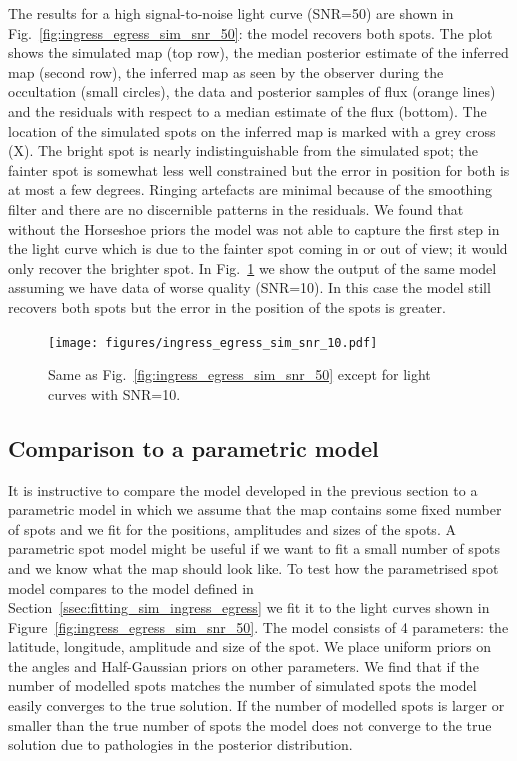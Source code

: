 \documentclass[12pt,dvipsnames]{report}
\begin{document}
The results for a high signal-to-noise light curve (SNR=50) are shown in Fig.~\ref{fig:ingress_egress_sim_snr_50}: the model recovers both spots.
The plot shows the simulated map (top row), the median posterior estimate of the inferred map (second row), the inferred map as seen by the observer during the occultation (small circles), the data and posterior samples of flux (orange lines) and the residuals with respect to a median estimate of the flux (bottom). 
The location of the simulated spots on the inferred map is marked with a grey cross (X).
The bright spot is nearly indistinguishable from the simulated spot; the fainter spot is somewhat less well constrained but the error in position for both is at most a few degrees.
Ringing artefacts are minimal because of the smoothing filter and there are no discernible patterns in the residuals.
We found that without the Horseshoe priors the model was not able to capture the first step in the light curve which is due to the fainter spot coming in or out of view; it would only recover the brighter spot.
In Fig.~\ref{fig:ingress_egress_sim_snr_10} we show the output of the same model assuming we have data of worse quality (SNR=10). 
In this case the model still recovers both spots but the error in the position of the spots is greater.

\begin{figure}[t!]
    \begin{centering}
        \texttt{[image: figures/ingress\_egress\_sim\_snr\_10.pdf]}
    \caption{
        Same as Fig.~\ref{fig:ingress_egress_sim_snr_50} except for light curves with SNR=10.
    }
       \label{fig:ingress_egress_sim_snr_10}
    \end{centering}
\end{figure}

\subsection{Comparison to a parametric model}
It is instructive to compare the model developed in the previous section to a parametric model in which we assume that the map contains some fixed number of spots and we fit for the positions, amplitudes and sizes of the spots.
A parametric spot model might be useful if we want to fit a small number of spots and we know what the map should look like.
To test how the parametrised spot model compares to the model defined in Section~\ref{ssec:fitting_sim_ingress_egress} we fit it to the light curves shown in Figure~\ref{fig:ingress_egress_sim_snr_50}. 
The model consists of 4 parameters: the latitude, longitude, amplitude and size of the spot.
We place uniform priors on the angles and Half-Gaussian priors on other parameters. 
We find that if the number of modelled spots matches the number of simulated spots the model easily converges to the true solution. 
If the number of modelled spots is larger or smaller than the true number of spots the model does not converge to the true solution due to pathologies in the posterior distribution.
\end{document}
